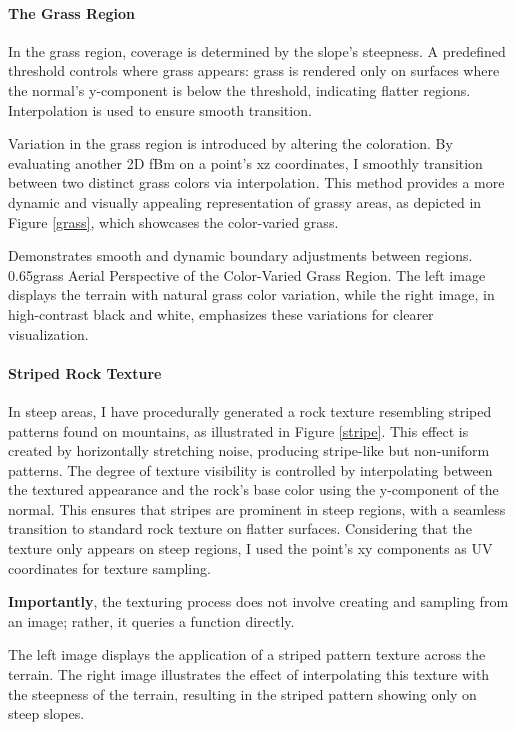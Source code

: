 \paragraph{The Grass Region}
In the grass region, coverage is determined by the slope's steepness. A predefined threshold controls where grass appears: grass is rendered only on surfaces where the normal's y-component is below the threshold, indicating flatter regions. Interpolation is used to ensure smooth transition. 

Variation in the grass region is introduced by altering the coloration. By evaluating another 2D fBm on a point's xz coordinates, I smoothly transition between two distinct grass colors via interpolation. This method provides a more dynamic and visually appealing representation of grassy areas, as depicted in Figure \ref{grass}, which showcases the color-varied grass.

{Demonstrates smooth and dynamic boundary adjustments between regions.}
{0.65}{grass}
{Aerial Perspective of the Color-Varied Grass Region. The left image displays the terrain with natural grass color variation, while the right image, in high-contrast black and white, emphasizes these variations for clearer visualization.}

\paragraph{Striped Rock Texture}
In steep areas, I have procedurally generated a rock texture resembling striped patterns found on mountains, as illustrated in Figure \ref{stripe}. This effect is created by horizontally stretching noise, producing stripe-like but non-uniform patterns. The degree of texture visibility is controlled by interpolating between the textured appearance and the rock's base color using the y-component of the normal. This ensures that stripes are prominent in steep regions, with a seamless transition to standard rock texture on flatter surfaces. Considering that the texture only appears on steep regions, I used the point's xy components as UV coordinates for texture sampling. 

\textbf{Importantly}, the texturing process does not involve creating and sampling from an image; rather, it queries a function directly.

{The left image displays the application of a striped pattern texture across the terrain. The right image illustrates the effect of interpolating this texture with the steepness of the terrain, resulting in the striped pattern showing only on steep slopes.}



